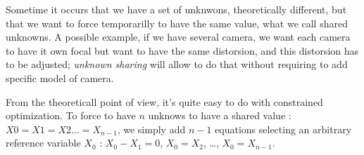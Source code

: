 Sometime it occurs  that we have a set of unknwons, theoretically different, but that we want to force
temporarilly to have the same value, what we call shared unknowns. A possible example, if we have several
camera, we want each camera to have it own focal but want to have the same distorsion, and this distorsion
has to be adjusted;  \emph{unknown sharing} will allow to do that without requiring to add specific model of camera.

From the theoreticall point of view, it's quite easy to do with constrained optimization.  To force to
have $n$ unknows to have a shared value : $X0=X1=X2\dots=X_{n-1}$, we simply add $n-1$ equations selecting
an arbitrary reference variable $X_0$ : $X_0-X_1=0$, $X_0=X_2$, \dots , $X_0=X_{n-1}$.








